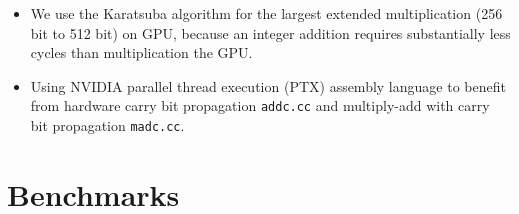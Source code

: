 \documentclass[oribibl]{llncs2e/llncs}
\begin{document}
\begin{itemize}
\item We use the Karatsuba algorithm \cite{Karatsuba1963} for the largest extended multiplication (256 bit to 512 bit) on GPU, because an integer addition requires substantially less cycles than multiplication the GPU.
\item Using NVIDIA parallel thread execution (PTX) assembly language to benefit from hardware carry bit propagation \verb|addc.cc| and multiply-add with carry bit propagation \verb|madc.cc|.
\end{itemize}

\section{Benchmarks}
\end{document}
